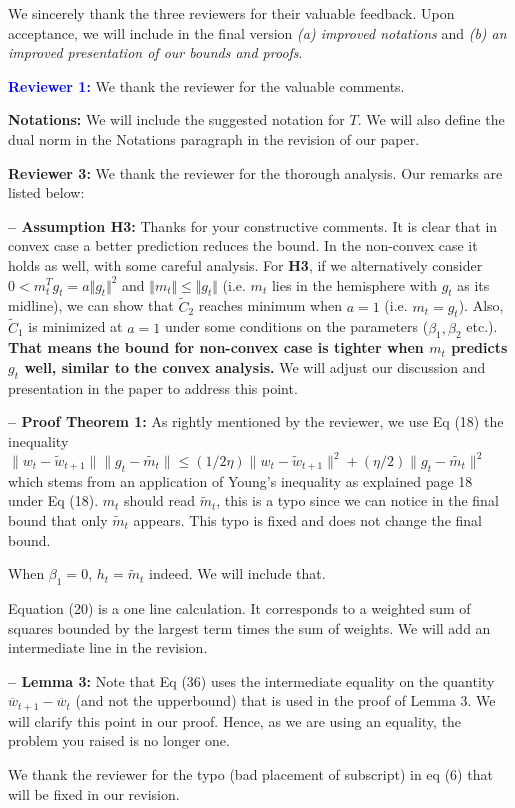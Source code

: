 \documentclass{article}
\begin{document}
We sincerely thank the three reviewers for their valuable feedback. 
Upon acceptance, we will include in the final version \emph{{\sf (a)} improved notations} and \emph{{\sf (b)} an improved presentation of our bounds and proofs}. 


\vspace{0.05in}

\textbf{\textcolor{blue}{Reviewer 1:}} We thank the reviewer for the valuable comments.\vspace{-5pt}

\medskip

\textbf{Notations:} 
We will include the suggested notation for $T$.
We will also define the dual norm in the Notations paragraph in the revision of our paper.

\vspace{0.05in}


\textbf{\textcolor{green!50!black}{Reviewer 3:}} We thank the reviewer for the thorough analysis. Our remarks are listed below:\vspace{-5pt}

\medskip
\textbf{-- Assumption H3:}
Thanks for your constructive comments. It is clear that in convex case a better prediction reduces the bound. In the non-convex case it holds as well, with some careful analysis. For \textbf{H3}, if we alternatively consider $0<m_t^T g_t=a\Vert g_t\Vert^2$ and $\Vert m_t\Vert\leq \Vert g_t\Vert$ (i.e. $m_t$ lies in the hemisphere with $g_t$ as its midline), we can show that $\tilde C_2$ reaches minimum when $a=1$ (i.e. $m_t=g_t$). Also, $\tilde C_1$ is minimized at $a=1$ under some conditions on the parameters ($\beta_1,\beta_2$ etc.). \textbf{That means the bound for non-convex case is tighter when $m_t$ predicts $g_t$ well, similar to the convex analysis.} We will adjust our discussion and presentation in the paper to address this point. \vspace{-5pt}

\medskip
\textbf{-- Proof Theorem 1:} As rightly mentioned by the reviewer, we use Eq (18) the inequality $\|w_t-\tilde{w}_{t+1}\|\|g_t-\tilde{m_t}\|\leq (1/2\eta)\|w_t-\tilde{w}_{t+1}\|^2+ (\eta/2)\|g_t-\tilde{m_t}\|^2$ which stems from an application of Young's inequality as explained page 18 under Eq (18). $m_t$ should read $\tilde{m}_t$, this is a typo since we can notice in the final bound that only $\tilde{m}_t$ appears. This typo is fixed and does not change the final bound.

When $\beta_1 = 0$, $h_t = \tilde{m}_t$ indeed. We will include that.

Equation (20) is a one line calculation. It corresponds to a weighted sum of squares bounded by the largest term times the sum of weights.
We will add an intermediate line in the revision.

\medskip
\textbf{-- Lemma 3:}
Note that Eq (36) uses the intermediate equality on the quantity $\overline{w}_{t+1} - \overline{w}_t$ (and not the upperbound) that is used in the proof of Lemma 3. We will clarify this point in our proof.
Hence, as we are using an equality, the problem you raised is no longer one.


We thank the reviewer for the typo (bad placement of subscript) in eq (6) that will be fixed in our revision.
\end{document}
